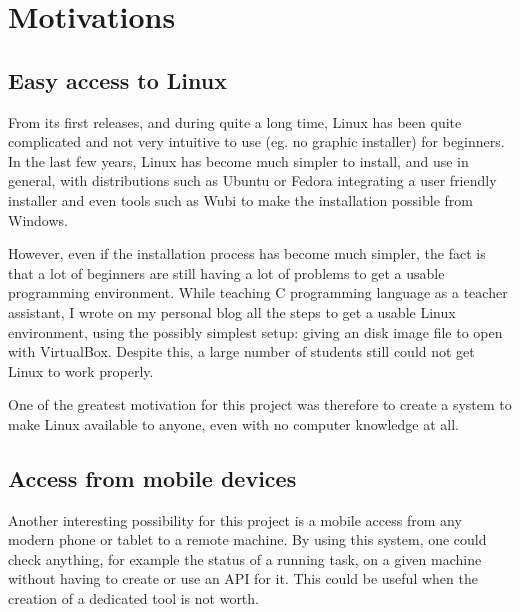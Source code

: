 \section{Motivations}
\subsection{Easy access to Linux}
From its first releases, and during quite a long time, Linux has been quite 
complicated and not very intuitive to use (eg. no graphic installer) for beginners.
In the last few years, Linux has become much simpler to install, and use in general, 
with distributions such as Ubuntu or Fedora integrating a user friendly installer 
and even tools such as Wubi to make the installation possible from Windows.

However, even if the installation process has become much simpler, the fact is that 
a lot of beginners are still having a lot of problems to get a usable programming 
environment. While teaching C programming language as a teacher assistant, I wrote 
on my personal blog all the steps to get a usable Linux environment, using the 
possibly simplest setup: giving an disk image file to open with VirtualBox. 
Despite this, a large number of students still could not get Linux to work properly.

One of the greatest motivation for this project was therefore to create a system to 
make Linux available to anyone, even with no computer knowledge at all.
%
\subsection{Access from mobile devices}
Another interesting possibility for this project is a mobile access from any modern 
phone or tablet to a remote machine. By using this system, one could check anything,
for example the status of a running task,  on a given machine without having 
to create or use an API for it. This could be useful when the creation of 
a dedicated tool is not worth.

